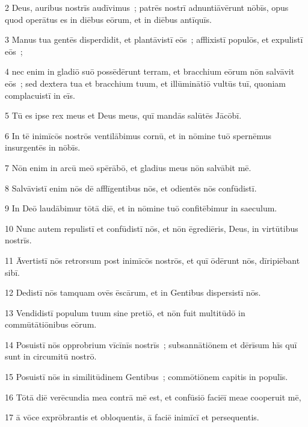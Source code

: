 \psalmVerse
  {\phantom{00}2}
  {Deus, auribus nostrīs audīvimus~; patrēs nostrī adnuntiāvērunt nōbīs, opus quod operātus es in diēbus eōrum, et in diēbus antīquīs.}


\psalmVerse
  {\phantom{00}3}
  {Manus tua gentēs disperdidit, et plantāvistī eōs~; afflixistī populōs, et expulistī eōs~;}


\psalmVerse
  {\phantom{00}4}
  {nec enim in gladiō suō possēdērunt terram, et bracchium eōrum nōn salvāvit eōs~; sed dextera tua et bracchium tuum, et illūminātiō vultūs tuī, quoniam complacuistī in eīs.}


\psalmVerse
  {\phantom{00}5}
  {Tū es ipse rex meus et Deus meus, quī mandās salūtēs Jācōbī.}


\psalmVerse
  {\phantom{00}6}
  {In tē inimīcōs nostrōs ventilābimus cornū, et in nōmine tuō spernēmus insurgentēs in nōbīs.}


\psalmVerse
  {\phantom{00}7}
  {Nōn enim in arcū meō spērābō, et gladius meus nōn salvābit mē.}


\psalmVerse
  {\phantom{00}8}
  {Salvāvistī enim nōs dē afflīgentibus nōs, et odientēs nōs confūdistī.}


\psalmVerse
  {\phantom{00}9}
  {In Deō laudābimur tōtā diē, et in nōmine tuō confitēbimur in saeculum.}


\psalmVerse
  {\phantom{0}10}
  {Nunc autem repulistī et confūdistī nōs, et nōn ēgrediēris, Deus, in virtūtibus nostrīs.}


\psalmVerse
  {\phantom{0}11}
  {Āvertistī nōs retrorsum post inimīcōs nostrōs, et quī ōdērunt nōs, dīripiēbant sibī.}


\psalmVerse
  {\phantom{0}12}
  {Dedistī nōs tamquam ovēs ēscārum, et in Gentibus dispersistī nōs.}


\psalmVerse
  {\phantom{0}13}
  {Vendidistī populum tuum sine pretiō, et nōn fuit multitūdō in commūtātiōnibus eōrum.}


\psalmVerse
  {\phantom{0}14}
  {Posuistī nōs opprobrium vīcīnīs nostrīs~; subsannātiōnem et dērīsum hīs quī sunt in circumitū nostrō.}


\psalmVerse
  {\phantom{0}15}
  {Posuistī nōs in similitūdinem Gentibus~; commōtiōnem capitis in populīs.}


\psalmVerse
  {\phantom{0}16}
  {Tōtā diē verēcundia mea contrā mē est, et confūsiō faciēī meae cooperuit mē,}


\psalmVerse
  {\phantom{0}17}
  {ā vōce exprōbrantis et obloquentis, ā faciē inimīcī et persequentis.}


